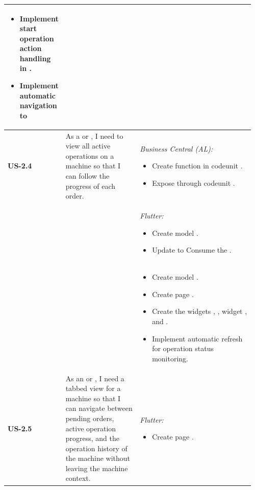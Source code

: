 \begin{longtable}{@{} P{0.09\linewidth} P{0.34\linewidth} P{0.53\linewidth} @{}}
\begin{itemize}[nosep, leftmargin=*]
    \item Implement start operation action handling in .
    \item Implement automatic navigation to 
  \end{itemize}\\
  \midrule
  \textbf{US-2.4}
  & As a  or , I need to view all
  active operations on a machine so that I can follow the progress of each
  order.
  & \noindent\textit{Business Central (AL):}
  \begin{itemize}[nosep, leftmargin=*]
    \item Create function  in codeunit .
    \item Expose  through codeunit .
  \end{itemize} \\ & &
  \noindent\textit{Flutter:}
  \begin{itemize}[nosep, leftmargin=*]
		\item Create model .
    \item Update  to Consume the .
  \end{itemize} \\ & &
  \begin{itemize}[nosep, leftmargin=*]
    \item Create model .
    \item Create page .
    \item Create the widgets , , widget , and .
    \item Implement automatic refresh for operation status monitoring.
  \end{itemize} \\
  \midrule
  \textbf{US-2.5}
  & As an  or , I need a tabbed view
  for a machine so that I can navigate between pending orders, active operation
  progress, and the operation history of the machine without leaving the 
  machine context.
  & \noindent\textit{Flutter:}
  \begin{itemize}[nosep, leftmargin=*]
    \item Create page .

\end{itemize}
\end{longtable}

